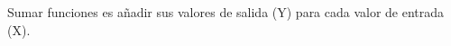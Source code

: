 \documentclass[preview]{standalone}
\begin{document}
\begin{center}
Sumar funciones es añadir sus valores de salida (Y) para cada valor de entrada (X).
\end{center}
\end{document}
